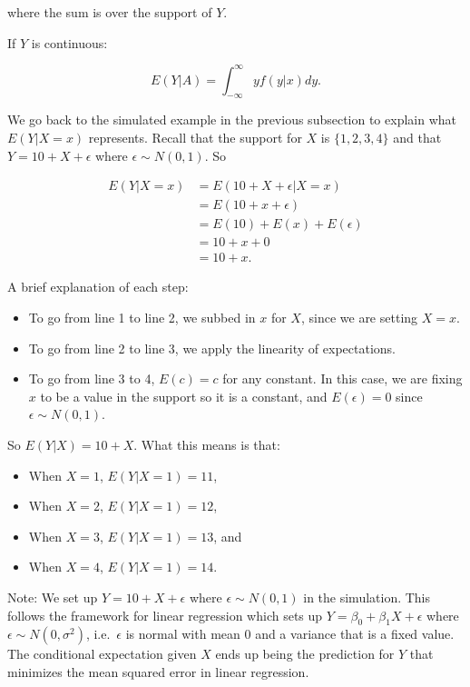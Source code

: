 \documentclass[
]{book}
\providecommand{\tightlist}{%
  \setlength{\itemsep}{0pt}\setlength{\parskip}{0pt}}
\begin{document}
where the sum is over the support of \(Y\).

If \(Y\) is continuous:

\begin{equation} 
E(Y|A) = \int_{-\infty}^{\infty} y f(y|x) dy.
\label{eq:5-condexpcont2}
\end{equation}

We go back to the simulated example in the previous subsection to explain what \(E(Y|X=x)\) represents. Recall that the support for \(X\) is \(\{1,2,3,4\}\) and that \(Y = 10 + X + \epsilon\) where \(\epsilon \sim N(0,1)\). So

\[
\begin{split}
E(Y|X=x) &= E(10 + X + \epsilon | X=x)\\
 &= E(10 + x + \epsilon) \\
 &= E(10) + E(x) + E(\epsilon) \\
&= 10 + x + 0 \\
 &= 10 + x.
\end{split}
\]

A brief explanation of each step:

\begin{itemize}
\tightlist
\item
  To go from line 1 to line 2, we subbed in \(x\) for \(X\), since we are setting \(X=x\).
\item
  To go from line 2 to line 3, we apply the linearity of expectations.
\item
  To go from line 3 to 4, \(E(c)=c\) for any constant. In this case, we are fixing \(x\) to be a value in the support so it is a constant, and \(E(\epsilon) = 0\) since \(\epsilon \sim N(0,1)\).
\end{itemize}

So \(E(Y|X) = 10 + X\). What this means is that:

\begin{itemize}
\tightlist
\item
  When \(X=1\), \(E(Y|X=1) = 11\),
\item
  When \(X=2\), \(E(Y|X=1) = 12\),
\item
  When \(X=3\), \(E(Y|X=1) = 13\), and
\item
  When \(X=4\), \(E(Y|X=1) = 14\).
\end{itemize}

Note: We set up \(Y = 10 + X + \epsilon\) where \(\epsilon \sim N(0,1)\) in the simulation. This follows the framework for linear regression which sets up \(Y = \beta_0 + \beta_1 X + \epsilon\) where \(\epsilon \sim N(0,\sigma^2)\), i.e.~\(\epsilon\) is normal with mean 0 and a variance that is a fixed value. The conditional expectation given \(X\) ends up being the prediction for \(Y\) that minimizes the mean squared error in linear regression.
\end{document}
